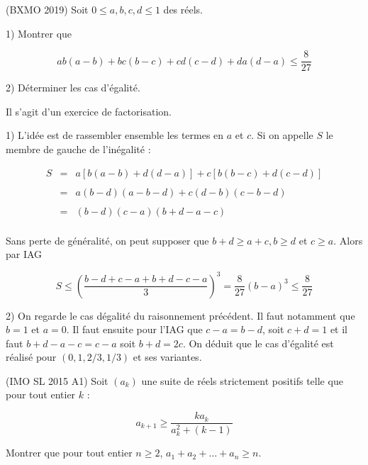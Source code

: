 \begin{exo}
(BXMO 2019) Soit $0\leqslant a,b,c,d\leqslant 1$ des réels.

1) Montrer que

\[ab(a-b)+bc(b-c)+cd(c-d)+da(d-a) \leqslant \frac{8}{27}\]

2) Déterminer les cas d'égalité.
\end{exo}

\begin{sol}
Il s'agit d'un exercice de factorisation.

1) L'idée est de rassembler ensemble les termes en $a$ et $c$. Si on appelle $S$ le membre de gauche de l'inégalité :

\[\begin{array}{lll}
S &=& a[b(a-b)+d(d-a)] + c[b(b-c)+d(c-d)]\\
&&\\
&=& a(b-d)(a-b-d) + c(d-b)(c-b-d)\\
&&\\
&=& (b-d)(c-a)(b+d-a-c)\\
\end{array}\]

Sans perte de généralité, on peut supposer que $b+d\geqslant a+c, b\geqslant d$ et $c\geqslant a$. Alors par IAG

\[S\leqslant \left(\frac{b-d+c-a+b+d-c-a}{3}\right)^3 = \frac{8}{27}(b-a)^3\leqslant \frac{8}{27}\]

2) On regarde le cas dégalité du raisonnement précédent. Il faut notamment que $b=1$ et $a=0$. Il faut ensuite pour l'IAG que $c-a=b-d$, soit $c+d=1$ et il faut $b+d-a-c= c-a$ soit $b+d=2c$. On déduit que le cas d'égalité est réalisé pour $(0,1,2/3,1/3)$ et ses variantes.
\end{sol}





\begin{exo}
(IMO SL 2015 A1)
Soit $(a_k)$ une suite de réels strictement positifs telle que pour tout entier $k$ :

\[a_{k+1} \geqslant \frac{ka_k}{a_k^2 +(k-1)}\]

Montrer que pour tout entier $n\geqslant 2$, $a_1+a_2+\ldots +a_n \geqslant n$.
\end{exo}

